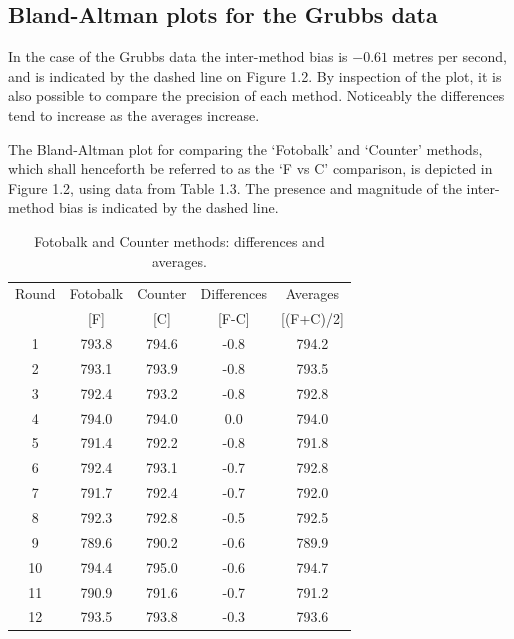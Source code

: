 \documentclass[Main.tex]{subfiles}
\begin{document}
\subsection{Bland-Altman plots for the Grubbs data}
In the case of the Grubbs data the inter-method bias is $-0.61$ metres per second, and is indicated by the dashed line on Figure 1.2. By inspection of the plot, it is also possible to compare the precision of each method. Noticeably the differences tend to increase as the averages increase.
	
	
The Bland-Altman plot for comparing the `Fotobalk' and `Counter' methods, which shall henceforth be referred to as the `F vs C'
comparison,  is depicted in Figure 1.2, using data from Table 1.3. The presence and magnitude of the inter-method bias is indicated
	by the dashed line.

	
	
	
	\begin{table}[h!]
		\renewcommand\arraystretch{0.7}%
		\begin{center}
			\begin{tabular}{|c||c|c||c|c|}
				\hline
				Round & Fotobalk  & Counter  & Differences  & Averages  \\
				&  [F] & [C] & [F-C] &  [(F+C)/2] \\
				\hline
				1 & 793.8 & 794.6 & -0.8 & 794.2 \\
				2 & 793.1 & 793.9 & -0.8 & 793.5 \\
				3 & 792.4 & 793.2 & -0.8 & 792.8 \\
				4 & 794.0 & 794.0 & 0.0 & 794.0 \\
				5 & 791.4 & 792.2 & -0.8 & 791.8 \\
				6 & 792.4 & 793.1 & -0.7 & 792.8 \\
				7 & 791.7 & 792.4 & -0.7 & 792.0 \\
				8 & 792.3 & 792.8 & -0.5 & 792.5 \\
				9 & 789.6 & 790.2 & -0.6 & 789.9 \\
				10 & 794.4 & 795.0 & -0.6 & 794.7 \\
				11 & 790.9 & 791.6 & -0.7 & 791.2 \\
				12 & 793.5 & 793.8 & -0.3 & 793.6 \\
				\hline
			\end{tabular}
			\caption{Fotobalk and Counter methods: differences and averages.}
		\end{center}
	\end{table}
	
\end{document}
